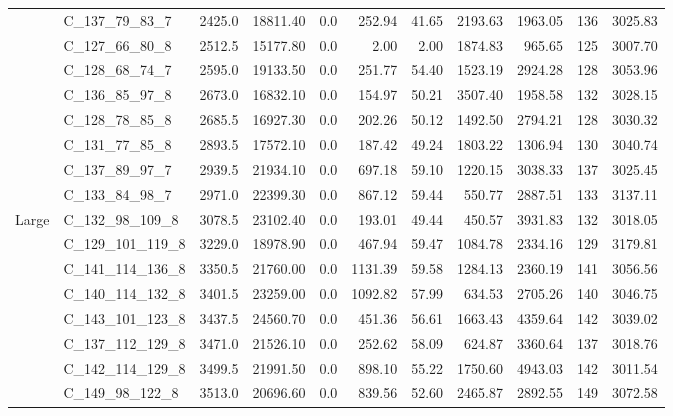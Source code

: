 \begin{tabular}{llrrrrrrrrr}
      & C\_137\_79\_83\_7 &  2425.0 &  18811.40 &  0.0 &   252.94 &    41.65 &  2193.63 &  1963.05 &         136 &  3025.83 \\
      & C\_127\_66\_80\_8 &  2512.5 &  15177.80 &  0.0 &     2.00 &     2.00 &  1874.83 &   965.65 &         125 &  3007.70 \\
      & C\_128\_68\_74\_7 &  2595.0 &  19133.50 &  0.0 &   251.77 &    54.40 &  1523.19 &  2924.28 &         128 &  3053.96 \\
      & C\_136\_85\_97\_8 &  2673.0 &  16832.10 &  0.0 &   154.97 &    50.21 &  3507.40 &  1958.58 &         132 &  3028.15 \\
      & C\_128\_78\_85\_8 &  2685.5 &  16927.30 &  0.0 &   202.26 &    50.12 &  1492.50 &  2794.21 &         128 &  3030.32 \\
      & C\_131\_77\_85\_8 &  2893.5 &  17572.10 &  0.0 &   187.42 &    49.24 &  1803.22 &  1306.94 &         130 &  3040.74 \\
      & C\_137\_89\_97\_7 &  2939.5 &  21934.10 &  0.0 &   697.18 &    59.10 &  1220.15 &  3038.33 &         137 &  3025.45 \\
      & C\_133\_84\_98\_7 &  2971.0 &  22399.30 &  0.0 &   867.12 &    59.44 &   550.77 &  2887.51 &         133 &  3137.11 \\
Large & C\_132\_98\_109\_8 &  3078.5 &  23102.40 &  0.0 &   193.01 &    49.44 &   450.57 &  3931.83 &         132 &  3018.05 \\
      & C\_129\_101\_119\_8 &  3229.0 &  18978.90 &  0.0 &   467.94 &    59.47 &  1084.78 &  2334.16 &         129 &  3179.81 \\
      & C\_141\_114\_136\_8 &  3350.5 &  21760.00 &  0.0 &  1131.39 &    59.58 &  1284.13 &  2360.19 &         141 &  3056.56 \\
      & C\_140\_114\_132\_8 &  3401.5 &  23259.00 &  0.0 &  1092.82 &    57.99 &   634.53 &  2705.26 &         140 &  3046.75 \\
      & C\_143\_101\_123\_8 &  3437.5 &  24560.70 &  0.0 &   451.36 &    56.61 &  1663.43 &  4359.64 &         142 &  3039.02 \\
      & C\_137\_112\_129\_8 &  3471.0 &  21526.10 &  0.0 &   252.62 &    58.09 &   624.87 &  3360.64 &         137 &  3018.76 \\
      & C\_142\_114\_129\_8 &  3499.5 &  21991.50 &  0.0 &   898.10 &    55.22 &  1750.60 &  4943.03 &         142 &  3011.54 \\
      & C\_149\_98\_122\_8 &  3513.0 &  20696.60 &  0.0 &   839.56 &    52.60 &  2465.87 &  2892.55 &         149 &  3072.58 \\

\end{tabular}
